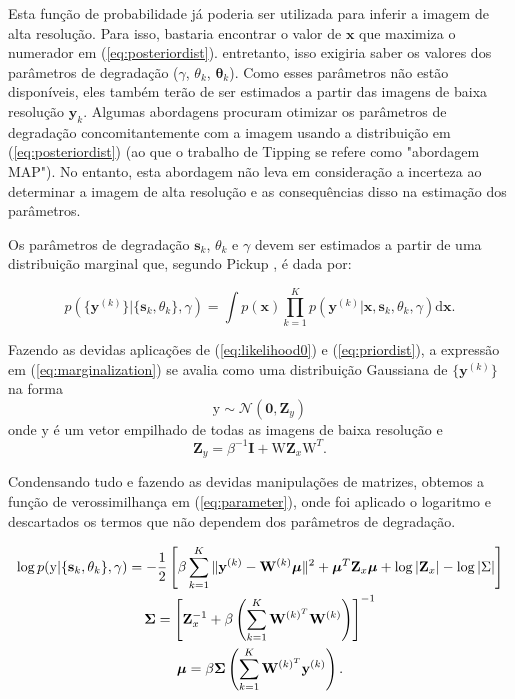 Esta função de probabilidade já poderia ser utilizada para inferir a imagem de alta resolução.
Para isso, bastaria encontrar o valor de $\mathbf{x}$ que maximiza o numerador em (\ref{eq:posteriordist}). entretanto, isso exigiria saber os valores dos parâmetros de degradação ($\gamma$, $\theta_k$, $\mathbf{\theta}_k$).
Como esses parâmetros não estão disponíveis, eles também terão de ser estimados a partir das imagens de baixa resolução $\mathbf{y}_k$. 
Algumas abordagens procuram otimizar os parâmetros de degradação concomitantemente com a imagem usando a distribuição em (\ref{eq:posteriordist}) (ao que o trabalho de Tipping \cite{tipping2003bayesian} se refere como "abordagem MAP"). No entanto, esta abordagem não leva em consideração a incerteza ao determinar a imagem de alta resolução e as consequências disso na estimação dos parâmetros.

Os parâmetros de degradação $\mathbf{s}_k$, $\theta_k$ e $\gamma$ devem ser estimados a partir de uma distribuição marginal que, segundo Pickup \cite{pickup2007bayesian2}, é dada por:

\begin{equation}
	\label{eq:marginalization}
	p(\{\mathbf{y}^{(k)}\} | \{\mathbf{s}_k, \theta_k \}, \gamma) = 
	\int  p(\mathbf{x})\prod^K_{k=1} p(\mathbf{y}^{(k)}|\mathbf{x},\mathbf{s}_k,\theta_k, \gamma) \mathrm{d}\mathbf{x}.
\end{equation}

Fazendo as devidas aplicações de (\ref{eq:likelihood0}) e (\ref{eq:priordist}), a expressão em (\ref{eq:marginalization}) se avalia como uma distribuição Gaussiana de $\{\mathbf{y}^{(k)}\}$ na forma
\begin{equation}
	\mathrm{y} \sim \mathcal{N}(\mathbf{0}, \mathbf{Z}_y)
\end{equation}
onde $\mathrm{y}$ é um vetor empilhado de todas as imagens de baixa resolução e
\begin{equation}
	\mathbf{Z}_y = \beta^{-1} \mathbf{I} + \mathrm{W} \mathbf{Z}_x \mathrm{W}^T.
\end{equation}


Condensando tudo e fazendo as devidas manipulações de matrizes, obtemos a função de verossimilhança em (\ref{eq:parameter}), onde foi aplicado o logaritmo e descartados os termos que não dependem dos parâmetros de degradação.

\begin{gather}
	\label{eq:parameter}
	\log p(\mathrm{y}|\{\mathbf{s}_k,\theta_k\}, \gamma) = -\frac{1}{2}\left[\beta \sum^K_{k=1} \|\mathbf{y}^{(k)} - \mathbf{W}^{(k)}\boldsymbol{\mu}\|^2
    + \boldsymbol{\mu}^T\mathbf{Z}_x \boldsymbol{\mu}
    \vphantom{\int_t} + \log |\mathbf{Z}_x| - \log{|\Sigma |} \right] \\
	\mathbf{ \Sigma }= \left[\mathbf{Z}^{-1}_x + \beta \left( \sum^K_{k = 1} \mathbf{W}^{(k)^T} \mathbf{W}^{(k)} \right) \right]^{-1} \\
	\boldsymbol{\mu} = \beta \mathbf{ \Sigma } \left( \sum^K_{k=1} \mathbf{W}^{(k)^T}\mathbf{y}^{(k)} \right).
\end{gather}

